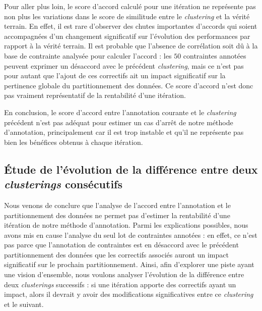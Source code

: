 			Pour aller plus loin, le score d'accord calculé pour une itération ne représente pas non plus les variations dans le score de similitude entre le \textit{clustering} et la vérité terrain.
			En effet, il est rare d'observer des chutes importantes d'accords qui soient accompagnées d'un changement significatif sur l'évolution des performances par rapport à la vérité terrain.
			Il est probable que l'absence de corrélation soit dû à la base de contrainte analysée pour calculer l'accord : les $50$ contraintes annotées peuvent exprimer un désaccord avec le précédent \textit{clustering}, mais ce n'est pas pour autant que l'ajout de ces correctifs ait un impact significatif sur la pertinence globale du partitionnement des données.
			Ce score d'accord n'est donc pas vraiment représentatif de la rentabilité d'une itération.
			
			En conclusion, le score d'accord entre l'annotation courante et le \textit{clustering} précédent n'est pas adéquat pour estimer un cas d'arrêt de notre méthode d'annotation, principalement car il est trop instable et qu'il ne représente pas bien les bénéfices obtenus à chaque itération.
	
	\subsection{Étude de l'évolution de la différence entre deux \textit{clusterings} consécutifs}
	\label{section:4.5.2-ETUDE-RENTABILITE-SIMILARITE-CLUSTERING}
		
		Nous venons de conclure que l'analyse de l'accord entre l'annotation et le partitionnement des données ne permet pas d'estimer la rentabilité d'une itération de notre méthode d'annotation.
		Parmi les explications possibles, nous avons mis en cause l'analyse du seul lot de contraintes annotées : en effet, ce n'est pas parce que l'annotation de contraintes est en désaccord avec le précédent partitionnement des données que les correctifs associés auront un impact significatif sur le prochain partitionnement.
		Ainsi, afin d'explorer une piste ayant une vision d'ensemble, nous voulons analyser l'évolution de la différence entre deux \textit{clusterings} successifs : si une itération apporte des correctifs ayant un impact, alors il devrait y avoir des modifications significatives entre ce \textit{clustering} et le suivant.
	
